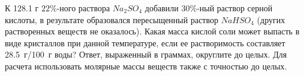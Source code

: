 
К 128.1 г $22\%$-ного раствора $Na_2SO_4$ добавили
$30\%$-ный раствор серной кислоты, в результате образовался пересыщенный раствор $NaHSO_4$ 
(других растворенных веществ не оказалось). Какая
масса кислой соли может выпасть в виде кристаллов при данной температуре, если
ее растворимость составляет 28.5~г/100~г воды? Ответ, выраженный в граммах,
округлите до целых. Для расчета использовать молярные массы веществ также с
точностью до целых.



